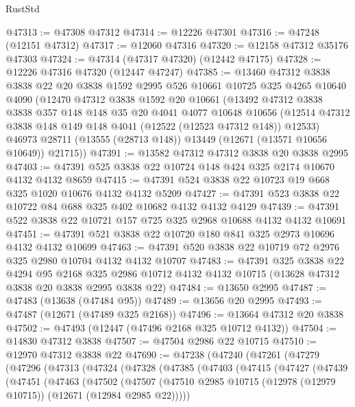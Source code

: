 \begin{lexlean}{RustStd}
\begin{coremodule}
@47313 := @47308 @47312
@47314 := @12226 @47301
@47316 := @47248 (@12151 @47312)
@47317 := @12060 @47316
@47320 := @12158 @47312 @35176 @47303
@47324 := @47314 (@47317 @47320) (@12442 @47175)
@47328 := @12226 @47316 @47320 (@12447 @47247)
@47385 := @13460
    @47312
    @3838
    @3838
    @22
    @20
    @3838
    @1592
    @2995
    @526
    @10661
    @10725
    @325
    @4265
    @10640
    @4090
    (@12470
      @47312
      @3838
      @1592
      @20
      @10661
      (@13492
        @47312
        @3838
        @3838
        @357
        @148
        @148
        @35
        @20
        @4041
        @4077
        @10648
        @10656
        (@12514 @47312 @3838 @148 @149 @148 @4041 (@12522 (@12523 @47312 @148)) @12533)
        @46973
        @28711
        (@13555 (@28713 @148))
        @13449
        (@12671 (@13571 @10656 @10649))
        @21715))
@47391 := @13582 @47312 @47312 @3838 @20 @3838 @2995
@47403 := @47391 @525 @3838 @22 @10724 @148 @424 @325 @2174 @10670 @4132 @4132 @8659
@47415 := @47391 @524 @3838 @22 @10723 @19 @668 @325 @1020 @10676 @4132 @4132 @5209
@47427 := @47391 @523 @3838 @22 @10722 @84 @688 @325 @402 @10682 @4132 @4132 @4129
@47439 := @47391 @522 @3838 @22 @10721 @157 @725 @325 @2968 @10688 @4132 @4132 @10691
@47451 := @47391 @521 @3838 @22 @10720 @180 @841 @325 @2973 @10696 @4132 @4132 @10699
@47463 := @47391 @520 @3838 @22 @10719 @72 @2976 @325 @2980 @10704 @4132 @4132 @10707
@47483 := @47391
    @325
    @3838
    @22
    @4294
    @95
    @2168
    @325
    @2986
    @10712
    @4132
    @4132
    @10715
    (@13628 @47312 @3838 @20 @3838 @2995 @3838 @22)
@47484 := @13650 @2995
@47487 := @47483 (@13638 (@47484 @95))
@47489 := @13656 @20 @2995
@47493 := @47487 (@12671 (@47489 @325 @2168))
@47496 := @13664 @47312 @20 @3838
@47502 := @47493 (@12447 (@47496 @2168 @325 @10712 @4132))
@47504 := @14830 @47312 @3838
@47507 := @47504 @2986 @22 @10715
@47510 := @12970 @47312 @3838 @22
@47690 := @47238
    (@47240
      (@47261
        (@47279
          (@47296
            (@47313
              (@47324
                (@47328
                  (@47385
                    (@47403
                      (@47415
                        (@47427
                          (@47439
                            (@47451
                              (@47463
                                (@47502
                                  (@47507
                                    (@47510
                                      @2985
                                      @10715
                                      (@12978 (@12979 @10715))
                                      (@12671 (@12984 @2985 @22)))))

\end{coremodule}
\end{lexlean}
